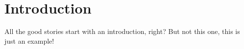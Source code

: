 \section{Introduction}
\label{sec:introduction}

All the good stories start with an introduction, right? But not this one, this is just an example!
